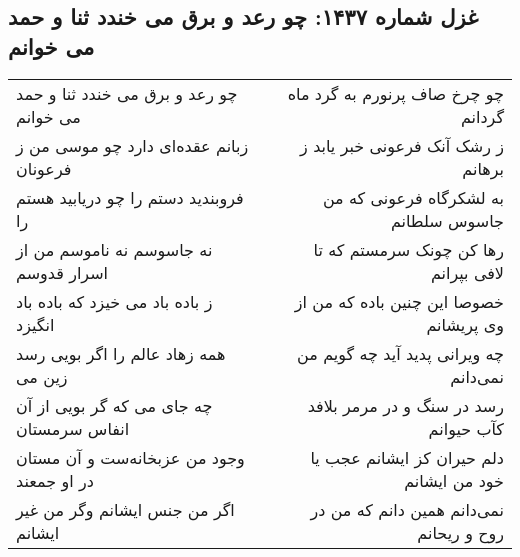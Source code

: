 \begin{center}
\section*{غزل شماره ۱۴۳۷: چو رعد و برق می خندد ثنا و حمد می خوانم}
\label{sec:1437}
\begin{longtable}{l p{0.5cm} r}
چو رعد و برق می خندد ثنا و حمد می خوانم
&&
چو چرخ صاف پرنورم به گرد ماه گردانم
\\
زبانم عقده‌ای دارد چو موسی من ز فرعونان
&&
ز رشک آنک فرعونی خبر یابد ز برهانم
\\
فروبندید دستم را چو دریابید هستم را
&&
به لشکرگاه فرعونی که من جاسوس سلطانم
\\
نه جاسوسم نه ناموسم من از اسرار قدوسم
&&
رها کن چونک سرمستم که تا لافی بپرانم
\\
ز باده باد می خیزد که باده باد انگیزد
&&
خصوصا این چنین باده که من از وی پریشانم
\\
همه زهاد عالم را اگر بویی رسد زین می
&&
چه ویرانی پدید آید چه گویم من نمی‌دانم
\\
چه جای می که گر بویی از آن انفاس سرمستان
&&
رسد در سنگ و در مرمر بلافد کآب حیوانم
\\
وجود من عزبخانه‌ست و آن مستان در او جمعند
&&
دلم حیران کز ایشانم عجب یا خود من ایشانم
\\
اگر من جنس ایشانم وگر من غیر ایشانم
&&
نمی‌دانم همین دانم که من در روح و ریحانم
\\
\end{longtable}
\end{center}
